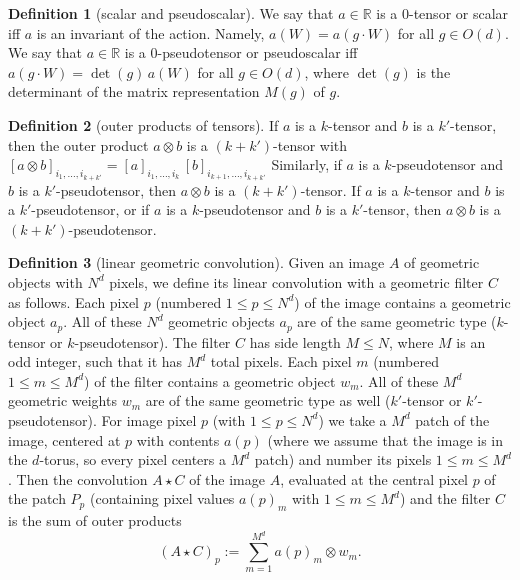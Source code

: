 \documentclass{article}
\theoremstyle{definition}
\newtheorem{definition}{Definition}
\begin{document}
\begin{definition}[scalar and pseudoscalar]
We say that $a\in \mathbb R$ is a $0$-tensor or scalar iff $a$ is an invariant of the action.
Namely, $a(W) = a(g\cdot W)$ for all $g\in O(d)$.
We say that
$a\in \mathbb R$ is a $0$-pseudotensor or pseudoscalar iff $a(g \cdot W) = \det(g)\,a(W)$ for all $g\in O(d)$,
where $\det(g)$ is the determinant of the matrix representation $M(g)$ of $g$.
\end{definition}

\begin{definition}[outer products of tensors]
If $a$ is a $k$-tensor and $b$ is a $k'$-tensor, then the outer product $a\otimes b$ is a $(k+k')$-tensor with $[a\otimes b]_{i_1,\ldots,i_{k+k'}} = [a]_{i_1,\ldots,i_k}\,[b]_{i_{k+1},\ldots,i_{k+k'}}$
Similarly, if $a$ is a $k$-pseudotensor and $b$ is a $k'$-pseudotensor, then $a\otimes b$ is a $(k+k')$-tensor.
If $a$ is a $k$-tensor and $b$ is a $k'$-pseudotensor, or if $a$ is a $k$-pseudotensor and $b$ is a $k'$-tensor, then $a\otimes b$ is a $(k+k')$-pseudotensor.
\end{definition}

\begin{definition}[linear geometric convolution]
Given an image $A$ of geometric objects with $N^d$ pixels, we define its linear convolution with a geometric filter $C$ as follows.
Each pixel $p$ (numbered $1\leq p\leq N^d$) of the image contains a geometric object $a_p$.
All of these $N^d$ geometric objects $a_p$ are of the same geometric type ($k$-tensor or $k$-pseudotensor).
The filter $C$ has side length $M\leq N$, where $M$ is an odd integer, such that it has $M^d$ total pixels.
Each pixel $m$ (numbered $1\leq m\leq M^d$) of the filter contains a geometric object $w_m$.
All of these $M^d$ geometric weights $w_m$ are of the same geometric type as well ($k'$-tensor or $k'$-pseudotensor).
For image pixel $p$ (with $1\leq p\leq N^d$) we take a $M^d$ patch of the image, centered at $p$ with contents $a(p)$ (where we assume that the image is in the $d$-torus, so every pixel centers a $M^d$ patch) and number its pixels $1\leq m\leq M^d$.
Then the convolution $A\star C$ of the image $A$, evaluated at the central pixel $p$ of the patch $P_p$ (containing pixel values $a(p)_m$ with $1\leq m\leq M^d$) and the filter $C$ is the sum of outer products
\begin{equation}
    (A\star C)_p := \sum_{m=1}^{M^d} a(p)_m \otimes w_m.
\end{equation}
\end{definition}
\end{document}
